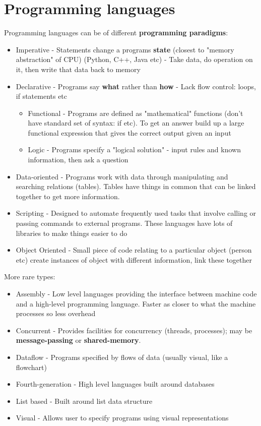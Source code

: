 \documentclass{article}[18pt]
\begin{document}
\section{Programming languages}
Programming languages can be of different \textbf{programming paradigms}:
\begin{itemize}
\item Imperative - Statements change a programs \textbf{state} (closest to "memory abstraction" of CPU) (Python, C++, Java etc) - Take data, do operation on it, then write that data back to memory
\item Declarative  - Programs say \textbf{what} rather than \textbf{how} - Lack flow control: loops, if statements etc
\begin{itemize}
\item Functional - Programs are defined as "mathematical" functions (don't have standard set of syntax: if etc). To get an answer build up a large functional expression that gives the correct output given an input
\item Logic - Programs specify a "logical solution" - input rules and known information, then ask a question
\end{itemize}
\item Data-oriented - Programs work with data through manipulating and searching relations (tables). Tables have things in common that can be linked together to get more information. 
\item Scripting - Designed to automate frequently used tasks that involve calling or passing commands to external programs. These languages have lots of libraries to make things easier to do
\item Object Oriented - Small piece of code relating to a particular object (person etc) create instances of object with different information, link these together
\end{itemize}
More rare types:
\begin{itemize}
\item Assembly - Low level languages providing the interface between machine code and a high-level programming language. Faster as closer to what the machine processes so less overhead
\item Concurrent - Provides facilities for concurrency (threads, processes); may be \textbf{message-passing} or \textbf{shared-memory}. 
\item Dataflow - Programs specified by flows of data (usually visual, like a flowchart)
\item Fourth-generation - High level languages built around databases
\item List based - Built around list data structure
\item Visual - Allows user to specify programs using visual representations
\end{itemize}
\end{document}

